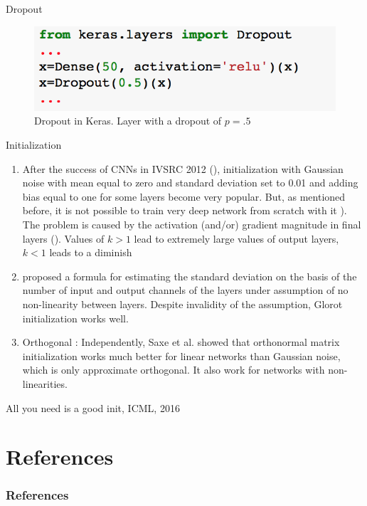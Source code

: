 \documentclass[xcolor=pdftex,dvipsnames,table,mathserif]{beamer}
\begin{document}
\begin{frame}{Dropout}
\begin{figure}
\includegraphics[width=.99 \columnwidth]{../graphics/DropoutKeras}
\caption{Dropout in Keras. Layer with a dropout of $p=.5$}
\end{figure}
\end{frame}
	
\begin{frame}{Initialization}
\begin{enumerate}
\item After the success of CNNs in IVSRC 2012 (\cite{krizhevsky2012imagenet}), initialization with Gaussian
noise with mean equal to zero and standard deviation set to 0.01 and adding bias equal to one
for some layers become very popular. But, as mentioned before, it is not possible to train very
deep network from scratch with it \cite{simonyan2014very}). The problem is caused by the
activation (and/or) gradient magnitude in final layers (\cite{he2016deep}).
Values of $k > 1$ lead to extremely large values of output layers, $k < 1$ leads to a diminish
\item \cite{glorot2010understanding}  proposed a formula for estimating the standard deviation on the basis of
the number of input and output channels of the layers under assumption of no non-linearity between
layers. Despite invalidity of the assumption, Glorot initialization works well.	
\item Orthogonal : Independently, Saxe et al. \cite{saxe2013exact}  showed that orthonormal matrix initialization works much better
for linear networks than Gaussian noise, which is only approximate orthogonal. It also work for
networks with non-linearities.
\end{enumerate}
All you need is a good init, ICML, 2016 \cite{mishkin2015all}
\end{frame}


\section{References}
\begin{frame}[allowframebreaks]
	\frametitle{References}
	
\end{frame}
\end{document}
